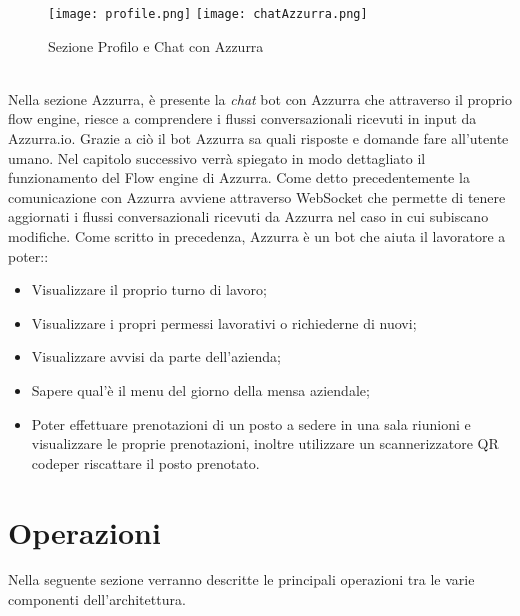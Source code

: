 \begin{trivlist}
	\begin{figure}[h]
		\begin{center}
			\texttt{[image: profile.png]}\hfil
			\texttt{[image: chatAzzurra.png]}
			\caption{Sezione Profilo e Chat con Azzurra}\label{fig:profile}
		\end{center}
	\end{figure}\\
	Nella sezione Azzurra, è presente la \emph{chat} \gls{bot}\ap{[g]} con Azzurra che attraverso il proprio flow engine, riesce a comprendere i flussi conversazionali ricevuti in input da Azzurra.io. Grazie a ciò il \gls{bot}\ap{[g]} Azzurra sa quali risposte e domande fare all'utente umano. Nel capitolo successivo verrà spiegato in modo dettagliato il funzionamento del Flow engine di Azzurra. Come detto precedentemente la comunicazione con Azzurra avviene attraverso \gls{WebSocket}\ap{[g]} che permette di tenere aggiornati i flussi conversazionali ricevuti da Azzurra nel caso in cui subiscano modifiche. Come scritto in precedenza, Azzurra è un \gls{bot}\ap{[g]} che aiuta il lavoratore a poter::
	\begin{itemize}
		\item Visualizzare il proprio turno di lavoro;
		\item Visualizzare i propri permessi lavorativi o richiederne di nuovi;
		\item Visualizzare avvisi da parte dell'azienda;
		\item Sapere qual'è il menu del giorno della mensa aziendale;
		\item Poter effettuare prenotazioni di un posto a sedere in una sala riunioni e visualizzare le proprie prenotazioni, inoltre utilizzare un scannerizzatore \gls{QR code}\glsfirstoccur per riscattare il posto prenotato.
	\end{itemize}	
	
\end{trivlist}
\section{Operazioni}
Nella seguente sezione verranno descritte le principali operazioni tra le varie componenti dell'\gls{architettura}\ap{[g]}.
